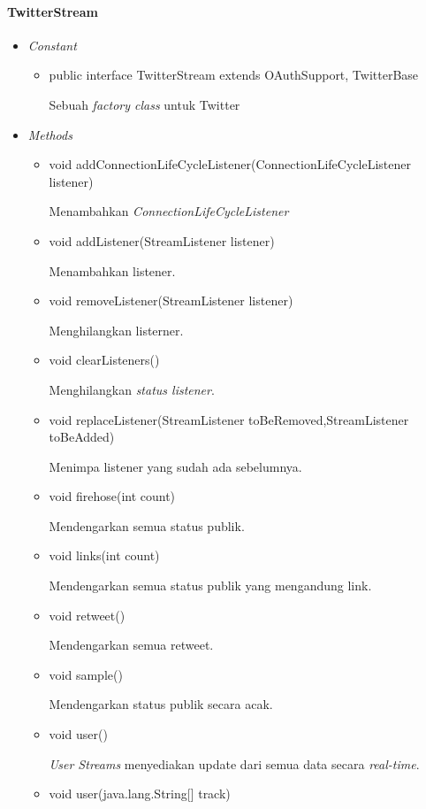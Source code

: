 	\paragraph{TwitterStream}
	\begin{itemize}
		\item \textit{Constant}
		
		\begin{itemize}
			\item public interface TwitterStream
			extends OAuthSupport, TwitterBase
			
			Sebuah \textit{factory class} untuk Twitter
		\end{itemize}
		
		\item \textit{Methods}
		
		\begin{itemize}
			\item void addConnectionLifeCycleListener(ConnectionLifeCycleListener listener)
			
			Menambahkan \textit{ConnectionLifeCycleListener}
			\item void addListener(StreamListener listener)
			
			Menambahkan listener.
			\item void removeListener(StreamListener listener)
			
			Menghilangkan listerner.
			\item void clearListeners()
			
			Menghilangkan \textit{status listener}.
			\item void replaceListener(StreamListener toBeRemoved,StreamListener toBeAdded)
			
			Menimpa listener yang sudah ada sebelumnya.
			\item void firehose(int count)
			
			Mendengarkan semua status publik.
			\item void links(int count)
			
			Mendengarkan semua status publik yang mengandung link.
			\item void retweet()
			
			Mendengarkan semua retweet.
			\item void sample()
			
			Mendengarkan status publik secara acak.
			\item void user()
			
			\textit{User Streams} menyediakan update dari semua data secara \textit{real-time}.
			\item void user(java.lang.String[] track)
			

\end{itemize}
\end{itemize}
